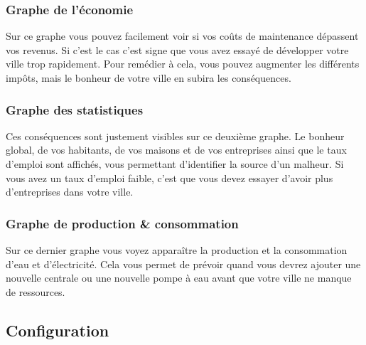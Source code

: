 \documentclass[11pt]{report}
\begin{document}
\subsubsection{Graphe de l'économie}
Sur ce graphe vous pouvez facilement voir si vos coûts de maintenance dépassent vos revenus. Si c'est le cas c'est signe que vous avez essayé de développer votre ville trop rapidement. Pour remédier à cela, vous pouvez augmenter les différents impôts, mais le bonheur de votre ville en subira les conséquences.
\subsubsection{Graphe des statistiques}
Ces conséquences sont justement visibles sur ce deuxième graphe. Le bonheur global, de vos habitants, de vos maisons et de vos entreprises ainsi que le taux d'emploi sont affichés, vous permettant d'identifier la source d'un malheur. Si vous avez un taux d'emploi faible, c'est que vous devez essayer d'avoir plus d'entreprises dans votre ville.
\subsubsection{Graphe de production \& consommation}
Sur ce dernier graphe vous voyez apparaître la production et la consommation d'eau et d'électricité.
Cela vous permet de prévoir quand vous devrez ajouter une nouvelle centrale ou une nouvelle pompe à eau avant que votre ville ne manque de ressources.

\newpage
\subsection{Configuration}
\end{document}
